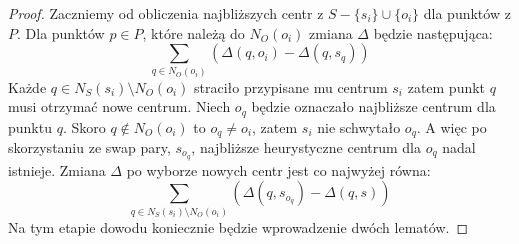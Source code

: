\begin{proof}
    Zaczniemy od obliczenia najbliższych centr z $S - \{s_{i}\} \cup \{o_{i}\}$ dla punktów z $P$.
    Dla punktów $p \in P$, które należą do $N_{O}(o_{i})$ zmiana $\Delta$ będzie następująca:
    \begin{equation}
        \sum_{q \in N_{O}(o_{i})} (\Delta(q, o_{i}) - \Delta(q, s_{q}))
    \end{equation}
    Każde $q \in N_{S}(s_{i}) \setminus N_{O}(o_{i})$ straciło przypisane mu centrum $s_{i}$ zatem punkt $q$ musi otrzymać nowe centrum.
    Niech $o_{q}$ będzie oznaczało najbliższe centrum dla punktu $q$.
    Skoro $q \notin N_{O}(o_{i})$ to $o_{q} \neq o_{i}$, zatem $s_{i}$ nie schwytało $o_{q}$.
    A więc po skorzystaniu ze swap pary, $s_{o_{q}}$, najbliższe heurystyczne centrum dla $o_{q}$ nadal istnieje.
    Zmiana $\Delta$ po wyborze nowych centr jest co najwyżej równa:
    \begin{equation}
        \sum_{q \in N_{S}(s_{i}) \setminus N_{O}(o_{i})} (\Delta(q, s_{o_{q}}) - \Delta(q, s))
    \end{equation}
    Na tym etapie dowodu koniecznie będzie wprowadzenie dwóch lematów.
    

\end{proof}
